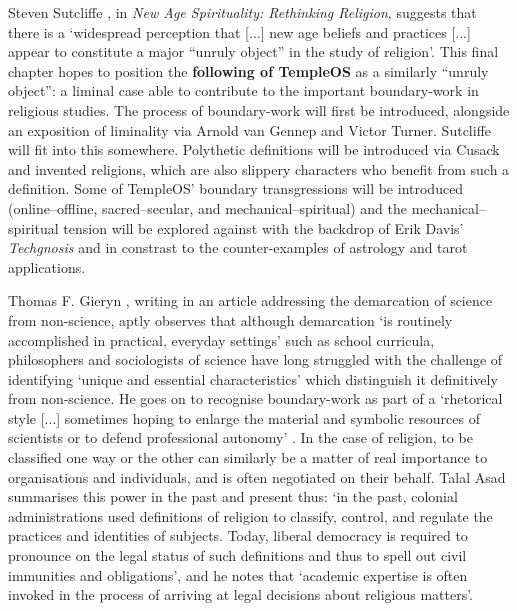 



Steven Sutcliffe \parencite*{Sutcliffe14},
in \textit{New Age Spirituality: Rethinking Religion},
suggests that there is a `widespread perception that [...]
new age beliefs and practices [...] appear to constitute
a major ``unruly object'' in the study of religion'.
This final chapter hopes to position the \textbf{following of TempleOS} as a
similarly ``unruly object'': a liminal case able to contribute to the
important boundary-work in religious studies.
The process of boundary-work will first be introduced,
alongside an exposition of liminality via Arnold van Gennep and Victor Turner.
Sutcliffe will fit into this somewhere.
Polythetic definitions will be introduced via Cusack and invented religions,
which are also slippery characters who benefit from such a definition.
Some of TempleOS' boundary transgressions will be introduced
(online--offline, sacred--secular, and mechanical--spiritual)
and the mechanical--spiritual tension will be explored
against with the backdrop of Erik Davis' \textit{Techgnosis}
and in constrast to the counter-examples of astrology and tarot applications.

Thomas F. Gieryn \parencite*[781]{Gieryn83}, writing in an article
addressing the demarcation of science from non-science, aptly observes
that although demarcation `is routinely accomplished in practical,
everyday settings' such as school curricula,
philosophers and sociologists of science have long struggled
with the challenge of identifying `unique and essential characteristics'
which distinguish it definitively from non-science.
He goes on to recognise boundary-work as part of a `rhetorical style [...]
sometimes hoping to enlarge the material and symbolic resources of scientists
or to defend professional autonomy' \parencite[782]{Gieryn83}.
In the case of religion, to be classified one way or the other can similarly
be a matter of real importance to organisations and individuals,
and is often negotiated on their behalf.
Talal Asad \parencite*[39]{Asad11} summarises this power
in the past and present thus:
`in the past, colonial  administrations  used definitions of religion
to classify, control, and regulate the practices and identities of subjects.
Today, liberal democracy  is required to pronounce on the legal status
of such definitions and thus to spell out civil immunities and obligations',
and he notes that `academic expertise is often invoked
in the process of arriving at legal decisions about religious matters'.

